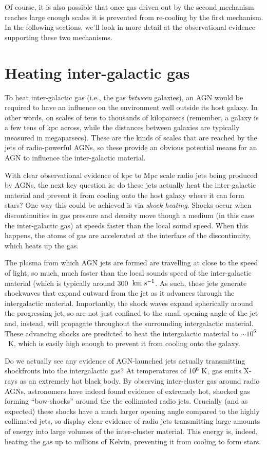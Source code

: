 \documentclass[11pt]{article}
\begin{document}
Of course, it is also possible that once gas driven out by the second
mechanism reaches large enough scales it is prevented from re-cooling
by the first mechanism. In the following sections, we'll look in more
detail at the observational evidence supporting these two mechanisms.

\section{Heating inter-galactic gas}
To heat inter-galactic gas (i.e., the gas {\it between} galaxies), an
AGN would be required to have an influence on the environment well
outside its host galaxy. In other words, on scales of tens to
thousands of kiloparsecs (remember, a galaxy is a few tens of kpc
across, while the distances between galaxies are typically measured in
megaparsecs). These are the kinds of scales that are reached by the
jets of radio-powerful AGNs, so these provide an obvious potential
means for an AGN to influence the inter-galactic material.

With clear observational evidence of kpc to Mpc scale radio jets being
produced by AGNs, the next key question is: do these jets actually
heat the inter-galactic material and prevent it from cooling onto the
host galaxy where it can form stars? One way this could be achieved is
via {\it shock heating}. Shocks occur when discontinuities in gas
pressure and density move though a medium (in this case the
inter-galactic gas) at speeds faster than the local sound speed. When
this happens, the atoms of gas are accelerated at the interface of the
discontinuity, which heats up the gas. 

The plasma from which AGN jets are formed are travelling at close to
the speed of light, so much, much faster than the local sounds speed
of the inter-galactic material (which is typically around
300~${\rm km~s^{-1}}$. As such, these jets generate shockwaves that expand
outward from the jet as it advances through the intergalactic
material. Importantly, the shock waves expand spherically around the
progressing jet, so are not just confined to the small opening angle
of the jet and, instead, will propagate throughout the surrounding
intergalactic material. These advancing shocks are predicted to heat
the intergalactic material to $\sim10^6$~K, which is easily high
enough to prevent it from cooling onto the galaxy.

Do we actually see any evidence of AGN-launched jets actually
transmitting shockfronts into the intergalactic gas? At temperatures
of $10^6~{\rm K}$, gas emits X-rays as an extremely hot black body. By
observing inter-cluster gas around radio AGNs, astronomers have indeed
found evidence of extremely hot, shocked gas forming ``bow-shocks''
around the the collimated radio jets. Crucially (and as expected)
these shocks have a much larger opening angle compared to the highly
collimated jets, so display clear evidence of radio jets transmitting
large amounts of energy into large volumes of the inter-cluster
material. This energy is, indeed, heating the gas up to millions of
Kelvin, preventing it from cooling to form stars.
\end{document}
